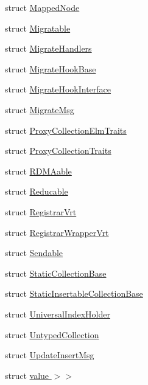 \begin{DoxyCompactItemize}
\item 
struct \hyperlink{structvt_1_1vrt_1_1collection_1_1_mapped_node}{Mapped\+Node}
\item 
struct \hyperlink{structvt_1_1vrt_1_1collection_1_1_migratable}{Migratable}
\item 
struct \hyperlink{structvt_1_1vrt_1_1collection_1_1_migrate_handlers}{Migrate\+Handlers}
\item 
struct \hyperlink{structvt_1_1vrt_1_1collection_1_1_migrate_hook_base}{Migrate\+Hook\+Base}
\item 
struct \hyperlink{structvt_1_1vrt_1_1collection_1_1_migrate_hook_interface}{Migrate\+Hook\+Interface}
\item 
struct \hyperlink{structvt_1_1vrt_1_1collection_1_1_migrate_msg}{Migrate\+Msg}
\item 
struct \hyperlink{structvt_1_1vrt_1_1collection_1_1_proxy_collection_elm_traits}{Proxy\+Collection\+Elm\+Traits}
\item 
struct \hyperlink{structvt_1_1vrt_1_1collection_1_1_proxy_collection_traits}{Proxy\+Collection\+Traits}
\item 
struct \hyperlink{structvt_1_1vrt_1_1collection_1_1_r_d_m_aable}{R\+D\+M\+Aable}
\item 
struct \hyperlink{structvt_1_1vrt_1_1collection_1_1_reducable}{Reducable}
\item 
struct \hyperlink{structvt_1_1vrt_1_1collection_1_1_registrar_vrt}{Registrar\+Vrt}
\item 
struct \hyperlink{structvt_1_1vrt_1_1collection_1_1_registrar_wrapper_vrt}{Registrar\+Wrapper\+Vrt}
\item 
struct \hyperlink{structvt_1_1vrt_1_1collection_1_1_sendable}{Sendable}
\item 
struct \hyperlink{structvt_1_1vrt_1_1collection_1_1_static_collection_base}{Static\+Collection\+Base}
\item 
struct \hyperlink{structvt_1_1vrt_1_1collection_1_1_static_insertable_collection_base}{Static\+Insertable\+Collection\+Base}
\item 
struct \hyperlink{structvt_1_1vrt_1_1collection_1_1_universal_index_holder}{Universal\+Index\+Holder}
\item 
struct \hyperlink{structvt_1_1vrt_1_1collection_1_1_untyped_collection}{Untyped\+Collection}
\item 
struct \hyperlink{structvt_1_1vrt_1_1collection_1_1_update_insert_msg}{Update\+Insert\+Msg}
\item 
struct \hyperlink{structvt_1_1vrt_1_1collection_1_1_default_map_3_01_collection_t_00_01typename_01std_1_1enable__ib7e55b659c64f165e6a671fb7294e371}{value $>$$>$}

\end{DoxyCompactItemize}
